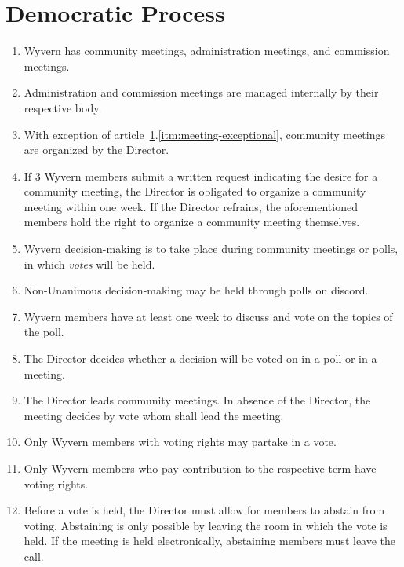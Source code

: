 \section{Democratic Process}
\label{sec:democratic-process}
\begin{enumerate}
    \item Wyvern has community meetings, administration meetings, and commission meetings.
    
    \item Administration and commission meetings are managed internally by their respective body.

    \item With exception of article~\ref{sec:democratic-process}.\ref{itm:meeting-exceptional}, community meetings are organized by the Director.
    
    \item \label{itm:meeting-exceptional} If 3 Wyvern members submit a written request indicating the desire for a community meeting, the Director is obligated to organize a community meeting within one week. If the Director refrains, the aforementioned members hold the right to organize a community meeting themselves.

    \item Wyvern decision-making is to take place during community meetings or polls, in which \emph{votes} will be held.
    
    \item Non-Unanimous decision-making may be held through polls on discord.
    
    \item Wyvern members have at least one week to discuss and vote on the topics of the poll.
    
    \item The Director decides whether a decision will be voted on in a poll or in a meeting.
    
    \item The Director leads community meetings. In absence of the Director, the meeting decides by vote whom shall lead the meeting.

    \item Only Wyvern members with voting rights may partake in a vote.
    
    \item Only Wyvern members who pay contribution to the respective term have voting rights.

    \item Before a vote is held, the Director must allow for members to abstain from voting. Abstaining is only possible by leaving the room in which the vote is held. If the meeting is held electronically, abstaining members must leave the call.
    

\end{enumerate}
